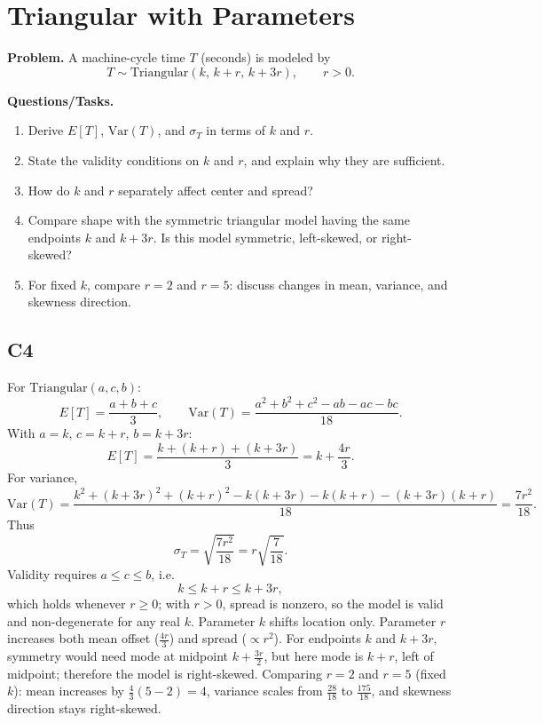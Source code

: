 \section{Triangular with Parameters}

\textbf{Problem.}
A machine-cycle time \(T\) (seconds) is modeled by
\[
T\sim \text{Triangular}(k,\,k+r,\,k+3r),\qquad r>0.
\]

\textbf{Questions/Tasks.}
\begin{enumerate}[label=\textbf{\alph*)}]
  \item Derive \(E[T]\), \(\mathrm{Var}(T)\), and \(\sigma_T\) in terms of \(k\) and \(r\).
  \item State the validity conditions on \(k\) and \(r\), and explain why they are sufficient.
  \item How do \(k\) and \(r\) separately affect center and spread?
  \item Compare shape with the symmetric triangular model having the same endpoints \(k\) and \(k+3r\). Is this model symmetric, left-skewed, or right-skewed?
  \item For fixed \(k\), compare \(r=2\) and \(r=5\): discuss changes in mean, variance, and skewness direction.
\end{enumerate}

\subsection*{C4}
For \(\text{Triangular}(a,c,b)\):
\[
E[T]=\frac{a+b+c}{3},\qquad
\mathrm{Var}(T)=\frac{a^2+b^2+c^2-ab-ac-bc}{18}.
\]
With \(a=k\), \(c=k+r\), \(b=k+3r\):
\[
E[T]=\frac{k+(k+r)+(k+3r)}{3}=k+\frac{4r}{3}.
\]
For variance,
\[
\mathrm{Var}(T)=\frac{k^2+(k+3r)^2+(k+r)^2-k(k+3r)-k(k+r)-(k+3r)(k+r)}{18}
=\frac{7r^2}{18}.
\]
Thus
\[
\sigma_T=\sqrt{\frac{7r^2}{18}}=r\sqrt{\frac{7}{18}}.
\]
Validity requires \(a\le c\le b\), i.e.
\[
k\le k+r\le k+3r,
\]
which holds whenever \(r\ge 0\); with \(r>0\), spread is nonzero, so the model is valid and non-degenerate for any real \(k\).
Parameter \(k\) shifts location only. Parameter \(r\) increases both mean offset (\(\frac{4r}{3}\)) and spread (\(\propto r^2\)).
For endpoints \(k\) and \(k+3r\), symmetry would need mode at midpoint \(k+\frac{3r}{2}\), but here mode is \(k+r\), left of midpoint; therefore the model is right-skewed.
Comparing \(r=2\) and \(r=5\) (fixed \(k\)): mean increases by \(\frac{4}{3}(5-2)=4\), variance scales from \(\frac{28}{18}\) to \(\frac{175}{18}\), and skewness direction stays right-skewed.
\begin{center}
\end{center}

